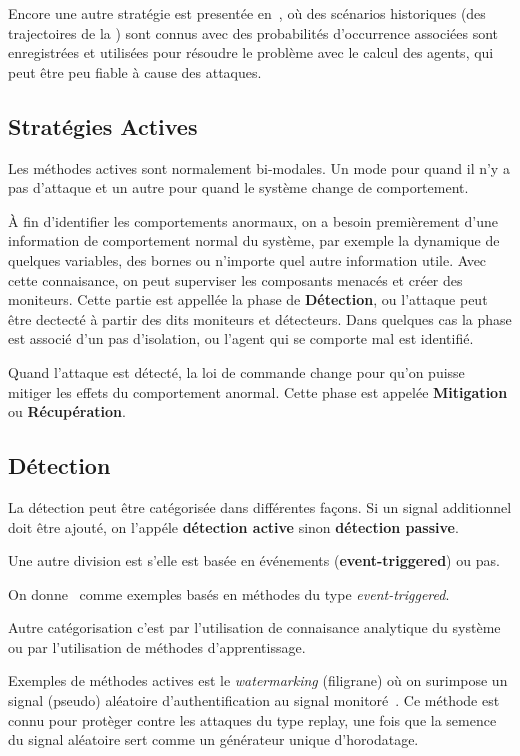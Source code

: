 \documentclass[../main.tex]{subfiles}
\begin{document}
Encore une autre stratégie est presentée en~\cite{VelardeEtAl2017a,MaestreEtAl2021}, où des scénarios historiques (des trajectoires de la \mpc{}) sont connus avec des probabilités d'occurrence associées sont enregistrées et utilisées pour résoudre le problème avec le calcul des agents, qui peut être peu fiable à cause des attaques.

\subsection{Stratégies Actives}\label{sec:protecting_against_attacks_fr}
Les méthodes actives sont normalement bi-modales.
Un mode pour quand il n'y a pas d'attaque et un autre pour quand le système change de comportement.

À fin d'identifier les comportements anormaux, on a besoin premièrement d'une information de comportement normal du système, par exemple la dynamique de quelques variables, des bornes ou n'importe quel autre information utile.
Avec cette connaisance, on peut superviser les composants menacés et créer des moniteurs.
Cette partie est appellée la phase de \textbf{Détection}, ou l'attaque peut être dectecté à partir des dits moniteurs et détecteurs.
Dans quelques cas la phase est associé d'un pas d'isolation, ou l'agent qui se comporte mal est identifié.

Quand l'attaque est détecté, la loi de commande change pour qu'on puisse mitiger les effets du comportement anormal.
Cette phase est appelée \textbf{Mitigation} ou \textbf{Récupération}.

\subsection{Détection}

La détection peut être catégorisée dans différentes façons.
Si un signal additionnel doit être ajouté, on l'appéle \textbf{détection active} sinon \textbf{détection passive}.

Une autre division est s'elle est basée en événements (\textbf{event-triggered}) ou pas.

On donne~\cite{SunYang2019,HuEtAl2021,SunEtAl2022} comme exemples basés en méthodes du type  \emph{event-triggered}.

Autre catégorisation c'est par l'utilisation de connaisance analytique du système ou par l'utilisation de méthodes d'apprentissage.

Exemples de méthodes actives est le \emph{watermarking} (filigrane) où on surimpose un signal (pseudo) aléatoire d'authentification au signal monitoré~\cite{MoSinopoli2009,MoEtAl2015,SatchidanandanKumar2017,KshetriVoas2017,LuciaEtAl2021}.
Ce méthode est connu pour protèger contre les attaques du type replay, une fois que la semence du signal aléatoire sert comme un générateur unique d'horodatage.
\end{document}
